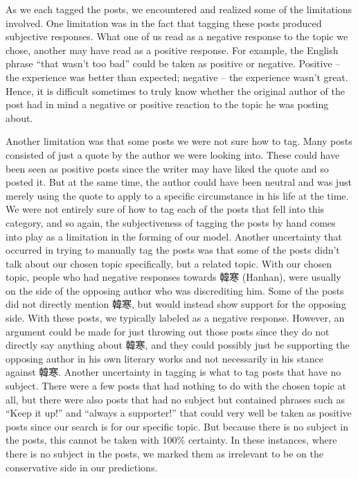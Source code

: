 \documentclass[11pt]{article}
\newcommand{\1}[1]{{\mathbf 1}\left\{#1\right\}}        %
\begin{document}
As we each tagged the posts, we encountered and realized some of the limitations involved. One limitation was in the fact that tagging these posts produced subjective responses.  What one of us read as a negative response to the topic we chose, another may have read as a positive response.  For example, the English phrase ``that wasn't too bad'' could be taken as positive or negative.  Positive -- the experience was better than expected; negative -- the experience wasn't great. Hence, it is difficult sometimes to truly know whether the original author of the post had in mind a negative or positive reaction to the topic he was posting about.  

Another limitation was that some posts we were not sure how to tag. Many posts consisted of just a quote by the author we were looking into.  These could have been seen as positive posts since the writer may have liked the quote and so posted it. But at the same time, the author could have been neutral and was just merely using the quote to apply to a specific circumstance in his life at the time. We were not entirely sure of how to tag each of the posts that fell into this category, and so again, the subjectiveness of tagging the posts by hand comes into play as a limitation in the forming of our model.  Another uncertainty that occurred in trying to manually tag the posts was that some of the posts didn't talk about our chosen topic specifically, but a related topic.  With our chosen topic, people who had negative responses towards 韓寒 (Hanhan), were usually on the side of the opposing author who was discrediting him.  Some of the posts did not directly mention 韓寒, but would instead show support for the opposing side. With these posts, we typically labeled as a negative response.  However, an argument could be made for just throwing out those posts since they do not directly say anything about 韓寒, and they could possibly just be supporting the opposing author in his own literary works and not necessarily in his stance against 韓寒.  Another uncertainty in tagging is what to tag posts that have no subject.  There were a few posts that had nothing to do with the chosen topic at all, but there were also posts that had no subject but contained phrases such as ``Keep it up!'' and ``always a supporter!'' that could very well be taken as positive posts since our search is for our specific topic. But because there is no subject in the posts, this cannot be taken with 100\% certainty. In these instances, where there is no subject in the posts, we marked them as irrelevant to be on the conservative side in our predictions. 
\end{document}
